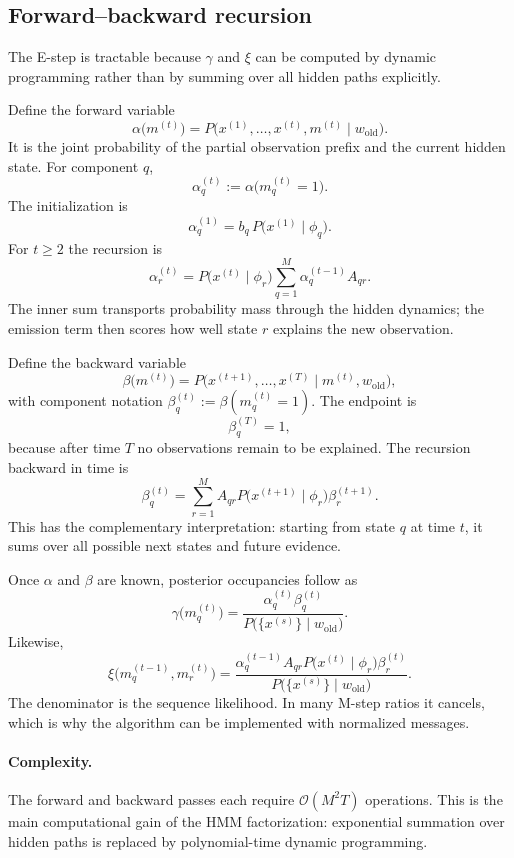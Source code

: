 \subsection{Forward--backward recursion}

The E-step is tractable because $\gamma$ and $\xi$ can be computed by dynamic programming rather than by summing over all hidden paths explicitly.

Define the forward variable
\[
  \alpha\bigl(m^{(t)}\bigr)
  =
  P\bigl(x^{(1)},\dots,x^{(t)},m^{(t)}\mid w_{\text{old}}\bigr).
\]
It is the joint probability of the partial observation prefix and the current hidden state. For component $q$,
\[
  \alpha_q^{(t)}
  :=
  \alpha\bigl(m_q^{(t)}=1\bigr).
\]
The initialization is
\[
  \alpha_q^{(1)}
  =
  b_q\,P\bigl(x^{(1)}\mid \phi_q\bigr).
\]
For $t\ge 2$ the recursion is
\[
  \alpha_r^{(t)}
  =
  P\bigl(x^{(t)}\mid \phi_r\bigr)
  \sum_{q=1}^{M}
  \alpha_q^{(t-1)}A_{qr}.
\]
The inner sum transports probability mass through the hidden dynamics; the emission term then scores how well state $r$ explains the new observation.

Define the backward variable
\[
  \beta\bigl(m^{(t)}\bigr)
  =
  P\bigl(x^{(t+1)},\dots,x^{(T)}\mid m^{(t)},w_{\text{old}}\bigr),
\]
with component notation $\beta_q^{(t)}:=\beta(m_q^{(t)}=1)$. The endpoint is
\[
  \beta_q^{(T)}=1,
\]
because after time $T$ no observations remain to be explained. The recursion backward in time is
\[
  \beta_q^{(t)}
  =
  \sum_{r=1}^{M}
  A_{qr}
  P\bigl(x^{(t+1)}\mid \phi_r\bigr)
  \beta_r^{(t+1)}.
\]
This has the complementary interpretation: starting from state $q$ at time $t$, it sums over all possible next states and future evidence.

Once $\alpha$ and $\beta$ are known, posterior occupancies follow as
\[
  \gamma\bigl(m_q^{(t)}\bigr)
  =
  \frac{\alpha_q^{(t)}\beta_q^{(t)}}{P\bigl(\{x^{(s)}\}\mid w_{\text{old}}\bigr)}.
\]
Likewise,
\[
  \xi\bigl(m_q^{(t-1)},m_r^{(t)}\bigr)
  =
  \frac{
    \alpha_q^{(t-1)}
    A_{qr}
    P\bigl(x^{(t)}\mid \phi_r\bigr)
    \beta_r^{(t)}
  }{
    P\bigl(\{x^{(s)}\}\mid w_{\text{old}}\bigr)
  }.
\]
The denominator is the sequence likelihood. In many M-step ratios it cancels, which is why the algorithm can be implemented with normalized messages.

\paragraph{Complexity.}
The forward and backward passes each require $\mathcal{O}(M^2T)$ operations. This is the main computational gain of the HMM factorization: exponential summation over hidden paths is replaced by polynomial-time dynamic programming.

